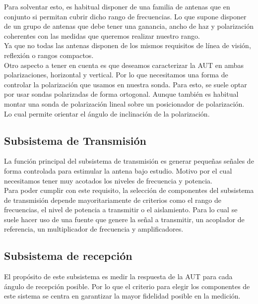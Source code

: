 Para solventar esto, es habitual disponer de una familia de antenas que en conjunto si permitan cubrir dicho rango de frecuencias. Lo que supone disponer de un grupo de antenas que debe tener una ganancia, ancho de haz y polarización coherentes con las medidas que queremos realizar nuestro rango.\\
Ya que no todas las antenas disponen de los mismos requisitos de línea de visión, reflexión o rangos compactos.
\\

Otro aspecto a tener en cuenta es que deseamos caracterizar la AUT en ambas polarizaciones, horizontal y vertical. Por lo que necesitamos una forma de controlar la polarización que usamos en nuestra sonda. Para esto, se suele optar por usar sondas polarizadas de forma ortogonal. Aunque también es habitual montar una sonda de polarización lineal sobre un posicionador de polarización. Lo cual permite orientar el ángulo de inclinación de la polarización.

\newpage

\subsection{Subsistema de Transmisión}

La función principal del subsistema de transmisión es generar pequeñas señales de forma controlada para estimular la antena bajo estudio. Motivo por el cual necesitamos tener muy acotados los niveles de frecuencia y potencia. 
\\

Para poder cumplir con este requisito, la selección de componentes del subsistema de transmisión depende mayoritariamente de criterios como el rango de frecuencias, el nivel de potencia a transmitir o el aislamiento. Para lo cual se suele hacer uso de una fuente que genere la señal a transmitir, un acoplador de referencia, un multiplicador de frecuencia y amplificadores. 

\subsection{Subsistema de recepción}

El propósito de este subsistema es medir la respuesta de la AUT para cada ángulo de recepción posible. Por lo que el criterio para elegir los componentes de este sistema se centra en garantizar la mayor fidelidad posible en la medición. 
\\

